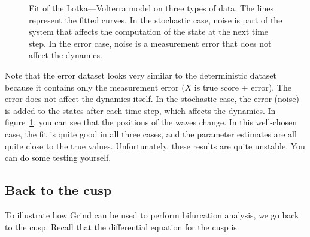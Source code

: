 \documentclass[
  a4paper,
  DIV=11,
  numbers=noendperiod,
  oneside]{scrreprt}
\begin{document}
\begin{figure}


\caption{\label{fig-ch4n-img1-old-49}Fit of the Lotka---Volterra model
on three types of data. The lines represent the fitted curves. In the
stochastic case, noise is part of the system that affects the
computation of the state at the next time step. In the error case, noise
is a measurement error that does not affect the dynamics.}

\end{figure}%

Note that the error dataset looks very similar to the deterministic
dataset because it contains only the measurement error (\(X\) is true
score + error). The error does not affect the dynamics itself. In the
stochastic case, the error (noise) is added to the states after each
time step, which affects the dynamics. In
figure~\ref{fig-ch4n-img1-old-49}, you can see that the positions of the
waves change. In this well-chosen case, the fit is quite good in all
three cases, and the parameter estimates are all quite close to the true
values. Unfortunately, these results are quite unstable. You can do some
testing yourself.

\subsection{Back to the cusp}\label{sec-Back-to-the-cusp}

To illustrate how Grind can be used to perform bifurcation analysis, we
go back to the cusp. Recall that the differential equation for the cusp
is
\end{document}
